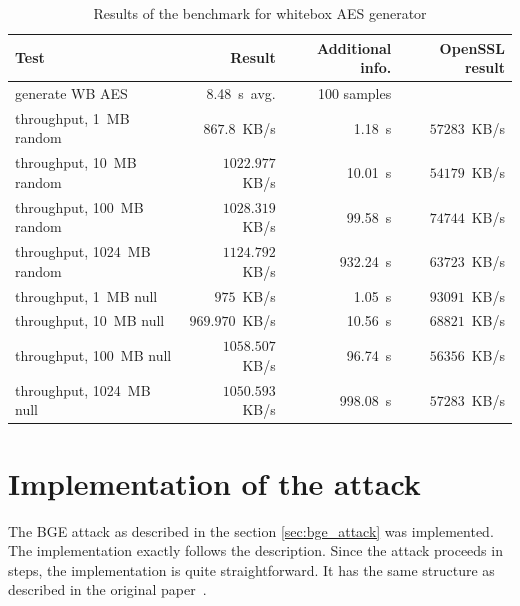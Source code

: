 \documentclass[11pt,oneside,final]{fithesis2}
\begin{document}
    \begin{table}[!htb]
    \begin{center}
    \begin{tabular}{ | l | r | r | r | }
	\hline
	Test                      & Result              &  Additional info.  & OpenSSL result             \\ \hline \hline
	generate WB AES           & 8.48~s~avg.         &  100 samples       &                             \\ \hline
	
	throughput, 1~MB    random   & $867.8$~KB/s     &  1.18~s            & $57283$~KB/s              \\ \hline
	throughput, 10~MB   random   & $1022.977$~KB/s  &  10.01~s           & $54179$~KB/s               \\ \hline
	throughput, 100~MB  random   & $1028.319$~KB/s  &  99.58~s           & $74744$~KB/s               \\ \hline
	throughput, 1024~MB random   & $1124.792$~KB/s  &  932.24~s          & $63723$~KB/s               \\ \hline
	
	throughput, 1~MB null       & $975$~KB/s        &  1.05~s            & $93091$~KB/s               \\ \hline
	throughput, 10~MB null      & $969.970$~KB/s    &  10.56~s           & $68821$~KB/s               \\ \hline
	throughput, 100~MB null     & $1058.507$~KB/s   &  96.74~s           & $56356$~KB/s               \\ \hline
	throughput, 1024~MB null    & $1050.593$~KB/s  &  998.08~s           & $57283$~KB/s               \\ \hline
    \end{tabular}
    \caption{Results of the benchmark for whitebox AES generator}
    \label{tbl:results_scheme_implementation}
    \end{center} 
    \end{table}
    

    \section{Implementation of the attack}
    The BGE attack as described in the section \ref{sec:bge_attack} was implemented. The implementation exactly follows the description. Since
    the attack proceeds in steps, the implementation is quite straightforward. It has the same structure as described in the original paper~\citep{Billet:2004:CWB:2080787.2080809}.
    
\end{document}
